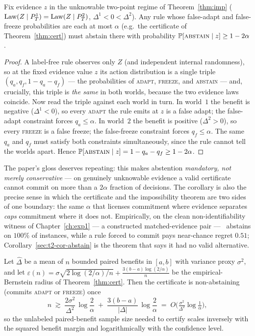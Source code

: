 \begin{corollary}
\label{sec:t2-cor-abstain}
Fix evidence $z$ in the unknowable two-point regime of Theorem~\ref{thm:imp}
($\Law(Z\mid P_T^1)=\Law(Z\mid P_T^2)$, $\Delta^1<0<\Delta^2$). Any rule whose
false-adapt and false-freeze probabilities are each at most $\alpha$ (e.g.\ the
certificate of Theorem~\ref{thm:cert}) must abstain there with probability
$\Pr[\textsc{abstain}\mid z]\ge 1-2\alpha$.
\end{corollary}

\begin{proof}
A label-free rule observes only $Z$ (and independent internal randomness), so at the
fixed evidence value $z$ its action distribution is a single triple
$(q_a,q_f,1-q_a-q_f)$ --- the probabilities of \textsc{adapt}, \textsc{freeze}, and
\textsc{abstain} --- and, crucially, this triple is \emph{the same} in both worlds,
because the two evidence laws coincide. Now read the triple against each world in
turn. In world~$1$ the benefit is negative ($\Delta^1<0$), so every \textsc{adapt} the
rule emits at $z$ is a false adapt; the false-adapt constraint forces $q_a\le\alpha$.
In world~$2$ the benefit is positive ($\Delta^2>0$), so every \textsc{freeze} is a
false freeze; the false-freeze constraint forces $q_f\le\alpha$. The same $q_a$ and
$q_f$ must satisfy both constraints simultaneously, since the rule cannot tell the
worlds apart. Hence
$\Pr[\textsc{abstain}\mid z]=1-q_a-q_f\ge1-2\alpha$. \qedhere
\end{proof}

The paper's gloss deserves repeating: this makes abstention \emph{mandatory, not merely
conservative} --- on genuinely unknowable evidence a valid certificate cannot commit on
more than a $2\alpha$ fraction of decisions. The corollary is also the precise sense in
which the certificate and the impossibility theorem are two sides of one boundary: the
same $\alpha$ that licenses commitment where evidence separates \emph{caps} commitment
where it does not. Empirically, on the clean non-identifiability witness of
Chapter~\ref{ch:exp1} --- a constructed matched-evidence pair --- \KGA\ abstains on
$100\%$ of instances, while a rule forced to commit pays near-chance regret $0.51$;
Corollary~\ref{sec:t2-cor-abstain} is the theorem that says it had no valid
alternative.

\begin{corollary}
\label{sec:t2-cor-n}
Let $\widehat\Delta$ be a mean of $n$ bounded paired benefits in $[a,b]$ with variance
proxy $\sigma^2$, and let
$\varepsilon(n)=\sigma\sqrt{2\log(2/\alpha)/n}+\tfrac{3(b-a)\log(2/\alpha)}{n}$
be the empirical-Bernstein radius of Theorem~\ref{thm:cert}. Then the certificate is
non-abstaining (commits \textsc{adapt} or \textsc{freeze}) once
\[
n\;\gtrsim\;\frac{2\sigma^2}{\Delta^2}\,\log\frac{2}{\alpha}\;+\;\frac{3(b-a)}{|\Delta|}\,\log\frac{2}{\alpha}
\;=\;O\!\Big(\tfrac{\sigma^2}{\Delta^2}\log\tfrac1\alpha\Big),
\]
so the unlabeled paired-benefit sample size needed to certify scales inversely with the
squared benefit margin and logarithmically with the confidence level.
\end{corollary}

